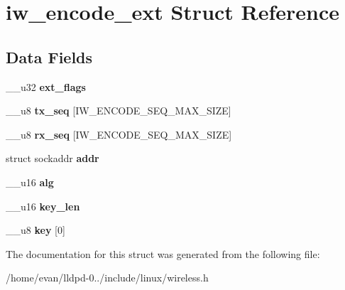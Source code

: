 \section{iw\-\_\-encode\-\_\-ext \-Struct \-Reference}
\label{structiw__encode__ext}
\subsection*{\-Data \-Fields}
\begin{DoxyCompactItemize}
\item 
\-\_\-\-\_\-u32 {\bfseries ext\-\_\-flags}\label{structiw__encode__ext_a583a8360a5c2011d1255fe495105c98f}

\item 
\-\_\-\-\_\-u8 {\bfseries tx\-\_\-seq} [\-I\-W\-\_\-\-E\-N\-C\-O\-D\-E\-\_\-\-S\-E\-Q\-\_\-\-M\-A\-X\-\_\-\-S\-I\-Z\-E]\label{structiw__encode__ext_a54dc38cf4c5f410608a424c5beeff50b}

\item 
\-\_\-\-\_\-u8 {\bfseries rx\-\_\-seq} [\-I\-W\-\_\-\-E\-N\-C\-O\-D\-E\-\_\-\-S\-E\-Q\-\_\-\-M\-A\-X\-\_\-\-S\-I\-Z\-E]\label{structiw__encode__ext_a7f20721db6c7b92569e49f7d49ad0eeb}

\item 
struct sockaddr {\bfseries addr}\label{structiw__encode__ext_a979fbf6cbda14801a80be566a480f4ad}

\item 
\-\_\-\-\_\-u16 {\bfseries alg}\label{structiw__encode__ext_a638dc42906bd7d6a3c59812b09cbb23e}

\item 
\-\_\-\-\_\-u16 {\bfseries key\-\_\-len}\label{structiw__encode__ext_a8f94a14a58f631480309264998665bf3}

\item 
\-\_\-\-\_\-u8 {\bfseries key} [0]\label{structiw__encode__ext_a919a6273aa83c9f9bedb85f174c9010b}

\end{DoxyCompactItemize}


\-The documentation for this struct was generated from the following file\-:\begin{DoxyCompactItemize}
\item 
/home/evan/lldpd-\/0../include/linux/wireless.\-h\end{DoxyCompactItemize}
